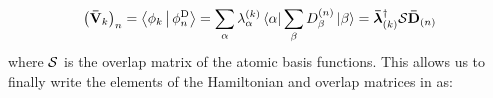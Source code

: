  \begin{equation}
  \begin{aligned}
     \left(\mathbf{ \bar{V} }_k\right)_n=\Braket{\phi_k|\phi^\text{D}_n} = \sum_{\alpha} \lambda^{(k)}_{\alpha} \Bra{\alpha} \sum_{\beta} D^{(n)}_{\beta} \Ket{\beta} = 
     \mathbf{ \bar{\boldsymbol{\lambda}} }_{(k)}^\dagger \mathbf{ \mathcal{S} } \mathbf{ \bar{D} }_{(n)} 
  \end{aligned}
   \label{eq:dipro_eq19}
 \end{equation}
where $\mathbf{ \mathcal{S} }$ is the overlap matrix of the atomic basis functions. This allows us to finally write the elements of the Hamiltonian and overlap matrices in  as:

